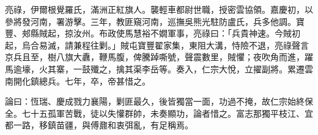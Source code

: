 \begin{pinyinscope}
亮祿，伊爾根覺羅氏，滿洲正紅旗人。襲輕車都尉世職，授密雲協領。嘉慶初，以參將發河南，署游擊。三年，教匪窺河南，巡撫吳熊光駐防盧氏，兵多他調。寶豐、郟縣賊起，掠汝州。布政使馬慧裕不嫺軍事，亮祿曰：「兵貴神速。今賊初起，烏合易滅，請兼程往剿。」賊屯寶豐翟家集，東阻大溝，恃險不退，亮祿聲言京兵且至，樹八旗大纛，鞭馬腹，俾騰踔嘶號，聲震數里，賊懼；夜吹角而進，躍馬逾壕，火其寨，一鼓殲之，擒其渠李岳等。奏入，仁宗大悅，立擢副將。累遷雲南開化鎮總兵。七年，卒，帝甚惜之。

論曰：恆瑞、慶成戮力襄陽，剿匪最久，後皆獨當一面，功過不掩，故仁宗始終保全。七十五孤軍苦戰，徒以失懽群帥，未奏顯功，論者惜之。富志那獨平枝江、宜都一路，移鎮苗疆，與傅鼐和衷弭亂，有足稱焉。


\end{pinyinscope}